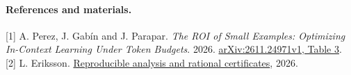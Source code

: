 \documentclass[11pt]{article}
\begin{document}
\paragraph{References and materials.}
[1] A. Perez, J. Gab\'in and J. Parapar. \emph{The ROI of Small Examples: Optimizing In-Context Learning Under Token Budgets}. 2026. \href{https://arxiv.org/html/2611.24971v1#S3.T3}{arXiv:2611.24971v1, Table 3}.\\
{[2]} L. Eriksson. \href{https://github.com/lluiseriksson/THE-ERIKSSON-PROGRAMME/tree/codex/anli-coste-20261120/audits/anli-demonstration-counts}{Reproducible analysis and rational certificates}, 2026.
\end{document}
